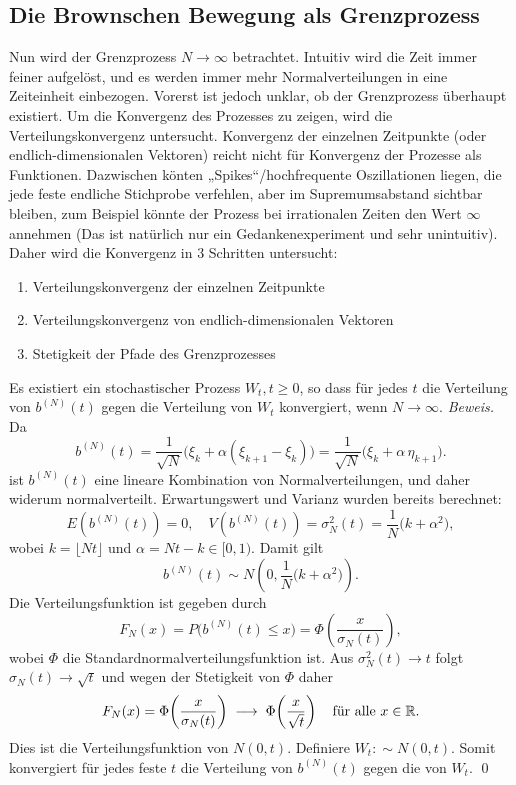 \subsection{Die Brownschen Bewegung als Grenzprozess}
Nun wird der Grenzprozess $N \to \infty$ betrachtet. Intuitiv wird die Zeit immer feiner aufgelöst,
und es werden immer mehr Normalverteilungen in eine Zeiteinheit einbezogen. Vorerst ist jedoch unklar, 
ob der Grenzprozess überhaupt existiert. Um die Konvergenz des Prozesses zu zeigen, wird die Verteilungskonvergenz 
untersucht. Konvergenz der einzelnen Zeitpunkte (oder endlich-dimensionalen Vektoren) reicht nicht 
für Konvergenz der Prozesse als Funktionen. Dazwischen könten „Spikes“/hochfrequente Oszillationen liegen,
die jede feste endliche Stichprobe verfehlen, aber im Supremumsabstand sichtbar bleiben, zum Beispiel könnte der
Prozess bei irrationalen Zeiten den Wert $\infty$ annehmen (Das ist natürlich nur ein Gedankenexperiment und 
sehr unintuitiv). Daher wird die Konvergenz in 3 Schritten untersucht:
\begin{enumerate}
  \item Verteilungskonvergenz der einzelnen Zeitpunkte
  \item Verteilungskonvergenz von endlich-dimensionalen Vektoren
  \item Stetigkeit der Pfade des Grenzprozesses
\end{enumerate}

\begin{lemma}
Es existiert ein stochastischer Prozess $W_t, t \geq 0$, so dass für jedes $t$ die Verteilung von $b^{(N)}(t)$ gegen die Verteilung von $W_t$ konvergiert, wenn $N \to \infty$.
\textit{Beweis.}
Da 
$$b^{(N)}(t) = \frac{1}{\sqrt{N}}\big(\xi_k+\alpha(\xi_{k+1}-\xi_k)\big)
=\frac{1}{\sqrt{N}}\big(\xi_k+\alpha\,\eta_{k+1}\big).
$$
ist $b^{(N)}(t)$ eine lineare Kombination von Normalverteilungen, und daher widerum 
normalverteilt. Erwartungswert und Varianz wurden bereits berechnet:
$$
E(b^{(N)}(t)) = 0, \quad V(b^{(N)}(t)) = \sigma_N^2(t) = \frac{1}{N}\big(k+\alpha^2\big),
$$
wobei $k=\lfloor Nt \rfloor$ und $\alpha=Nt-k\in[0,1)$. Damit gilt
$$
b^{(N)}(t) \sim N\left(0,\frac{1}{N}\big(k+\alpha^2\big)\right).
$$
Die Verteilungsfunktion ist gegeben durch
$$
F_N(x)=P\big(b^{(N)}(t)\le x\big)=\Phi\!\left(\frac{x}{\sigma_N(t)}\right),
$$
wobei $\Phi$ die Standardnormalverteilungsfunktion ist. Aus $\sigma_N^2(t)\to t$ folgt $\sigma_N(t)\to \sqrt{t}$ und wegen der Stetigkeit von $\Phi$ daher
$$
F_N(x)=\Phi\!\left(\frac{x}{\sigma_N(t)}\right)\;\longrightarrow\;\Phi\!\left(\frac{x}{\sqrt{t}}\right)\quad\text{für alle }x\in\Bbb R.
$$
Dies ist die Verteilungsfunktion von $N(0,t)$. Definiere $W_t :\sim N(0,t)$. Somit konvergiert für jedes feste $t$ die Verteilung von $b^{(N)}(t)$ gegen die von $W_t$. 
\qed
\end{lemma}

